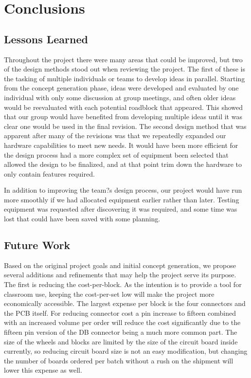 \documentclass[12pt,a4paper]{article}
\begin{document}
     \section{Conclusions}
     \subsection{Lessons Learned}
     Throughout the project there were many areas that could be improved, but two of the design methods stood out when reviewing the project. The first of these is the tasking of multiple individuals or teams to develop ideas in parallel. Starting from the concept generation phase, ideas were developed and evaluated by one individual with only some discussion at group meetings, and often older ideas would be reevaluated with each potential roadblock that appeared. This showed that our group would have benefited from developing multiple ideas until it was clear one would be used in the final revision.  The second design method that was apparent after many of the revisions was that we repeatedly expanded our hardware capabilities to meet new needs. It would have been more efficient for the design process had a more complex set of equipment been selected that allowed the design to be finalized, and at that point trim down the hardware to only contain features required.
     
     In addition to improving the team?s design process, our project would have run more smoothly if we had allocated equipment earlier rather than later. Testing equipment was requested after discovering it was required, and some time was lost that could have been saved with some planning.
     \subsection{Future Work}	
     Based on the original project goals and initial concept generation, we propose several additions and refinements that may help the project serve its purpose. The first is reducing the cost-per-block. As the intention is to provide a tool for classroom use, keeping the cost-per-set low will make the project more economically accessible. The largest expense per block is the four connectors and the PCB itself. For reducing connector cost a pin increase to fifteen combined with an increased volume per order will reduce the cost significantly due to the fifteen pin version of the DB connector being a much more common part. The size of the wheels and blocks are limited by the size of the circuit board inside currently, so reducing circuit board size is not an easy modification, but changing the number of boards ordered per batch without a rush on the shipment will lower this expense as well.
     
\end{document}
